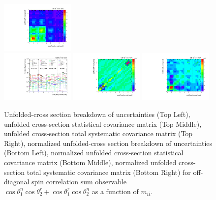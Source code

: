 \begin{refsection}
\begin{figure}[htb]
\begin{center}
 \includegraphics[width=0.32\textwidth]{fig_fullRun2UL/unfolding/combined/TotalSystCovMatrix_rebinnedB_c_Pnr_mttbar.pdf} \\
 \includegraphics[width=0.32\textwidth]{fig_fullRun2UL/unfolding/combined/deltaSystCombinedlogNorm_rebinnedB_c_Pnr_mttbar.pdf}
 \includegraphics[width=0.32\textwidth]{fig_fullRun2UL/unfolding/combined/StatCovMatrixNorm_rebinnedB_c_Pnr_mttbar.pdf}
 \includegraphics[width=0.32\textwidth]{fig_fullRun2UL/unfolding/combined/TotalSystCovMatrixNorm_rebinnedB_c_Pnr_mttbar.pdf} \\
\caption{Unfolded-cross section breakdown of uncertainties (Top Left), unfolded cross-section statistical covariance matrix (Top Middle), unfolded cross-section total systematic covariance matrix (Top Right), normalized unfolded-cross section breakdown of uncertainties (Bottom Left), normalized unfolded cross-section statistical covariance matrix (Bottom Middle), normalized unfolded cross-section total systematic covariance matrix (Bottom Right) for off-diagonal spin correlation sum observable $\cos\theta_{1}^{n}\cos\theta_{2}^{r}+\cos\theta_{1}^{r}\cos\theta_{2}^{n}$ as a function of $m_{t\bar{t}}$.}
\label{fig:c_Pnr_mttbar_uncertainties}
\end{center}

\end{figure}
\end{refsection}
